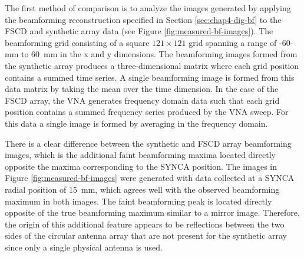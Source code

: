 The first method of comparison is to analyze the images generated by applying the beamforming reconstruction specified in Section \ref{sec:chap4-dig-bf} to the FSCD and synthetic array data (see Figure \ref{fig:measured-bf-images}). The beamforming grid consisting of a square $121\times121$ grid spanning a range of -60-mm to 60~mm in the x and y dimensions. The beamforming images formed from the synthetic array produces a three-dimensional matrix where each grid position contains a summed time series. A single beamforming image is formed from this data matrix by taking the mean over the time dimension. In the case of the FSCD array, the VNA generates frequency domain data such that each grid position contains a summed frequency series produced by the VNA sweep. For this data a single image is formed by averaging in the frequency domain.

There is a clear difference between the synthetic and FSCD array beamforming images, which is the additional faint beamforming maxima located directly opposite the maxima corresponding to the SYNCA position. The images in Figure \ref{fig:measured-bf-images} were generated with data collected at a SYNCA radial position of 15~mm, which agrees well with the observed beamforming maximum in both images. The faint beamforming peak is located directly opposite of the true beamforming maximum similar to a mirror image. Therefore, the origin of this additional feature appears to be reflections between the two sides of the circular antenna array that are not present for the synthetic array since only a single physical antenna is used.

